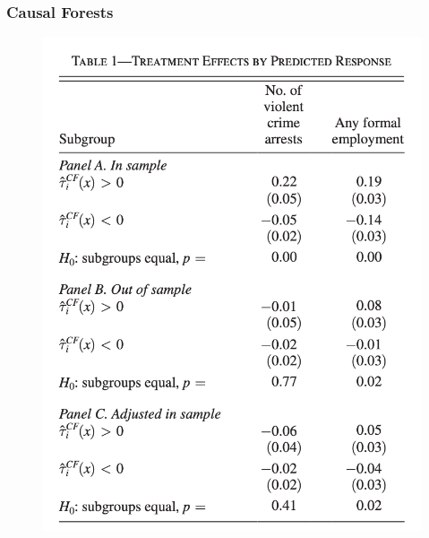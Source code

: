 \documentclass[
  shownotes,
  xcolor={svgnames},
  hyperref={colorlinks,citecolor=DarkBlue,linkcolor=DarkRed,urlcolor=DarkBlue}
  , aspectratio=169]{beamer}
\begin{document}
\begin{frame}[fragile]
\frametitle{Causal Forests}

\begin{figure}[H] \centering
            \captionsetup{justification=centering}
              \includegraphics[scale=0.4]{figures/results_aer_trees.png}
              \\
            
 \end{figure}

\end{frame}

\end{document}
